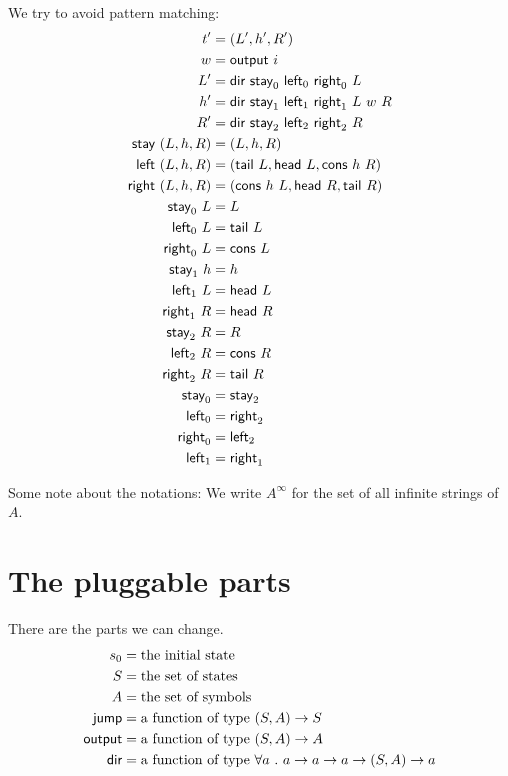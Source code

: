 We try to avoid pattern matching:
\begin{align}
    t' &= (L',h',R')
    \\
    w &= \textsf{output}~i
    \\
    L' &= \textsf{dir}~\textsf{stay}_0~\textsf{left}_0~\textsf{right}_0~L
    \\
    h' &= \textsf{dir}~\textsf{stay}_1~\textsf{left}_1~\textsf{right}_1~L~w~R
    \\
    R' &= \textsf{dir}~\textsf{stay}_2~\textsf{left}_2~\textsf{right}_2~R
    \\
    \textsf{stay}~(L,h,R) &= (L,h,R)
    \\
    \textsf{left}~(L,h,R) &= (\textsf{tail}~L, \textsf{head}~L, \textsf{cons}~h~R)
    \\
    \textsf{right}~(L,h,R) &= (\textsf{cons}~h~L, \textsf{head}~R, \textsf{tail}~R)
    \\
    \textsf{stay}_0~L &= L
    \\
    \textsf{left}_0~L &= \textsf{tail}~L
    \\
    \textsf{right}_0~L &= \textsf{cons}~L
    \\
    \textsf{stay}_1~h &= h
    \\
    \textsf{left}_1~L &= \textsf{head}~L
    \\
    \textsf{right}_1~R &= \textsf{head}~R
    \\
    \textsf{stay}_2~R &= R
    \\
    \textsf{left}_2~R &= \textsf{cons}~R
    \\
    \textsf{right}_2~R &= \textsf{tail}~R
    \\
    \textsf{stay}_0 &= \textsf{stay}_2
    \\
    \textsf{left}_0 &= \textsf{right}_2
    \\
    \textsf{right}_0 &= \textsf{left}_2
    \\
    \textsf{left}_1 &= \textsf{right}_1
\end{align}

Some note about the notations:
We write \(A^\infty\) for the set of all infinite strings of \(A\).

\section{The pluggable parts}

There are the parts we can change.
\begin{align}
    s_0 &= \text{the initial state}
    \\
    S &= \text{the set of states}
    \\
    A &= \text{the set of symbols}
    \\
    \textsf{jump} &= \text{a function of type \((S,A) \to S\)}
    \\
    \textsf{output} &= \text{a function of type \((S,A) \to A\)}
    \\
    \textsf{dir} &= \text{a function of type \(\forall a ~.~ a \to a \to a \to (S,A) \to a\)}
\end{align}

